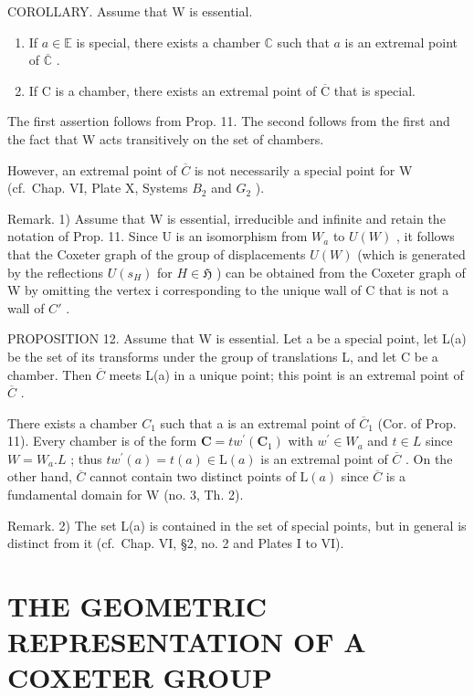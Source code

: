 COROLLARY. Assume that W is essential.

\begin{enumerate}
\def\labelenumi{(\roman{enumi})}
\item
  If \(a \in \mathbb{E}\) is special, there exists a chamber \(\mathbb{C}\) such that \(a\) is an extremal point of \(\overline{\mathbb{C}}\) .
\item
  If \(\mathrm{C}\) is a chamber, there exists an extremal point of \(\overline{\mathrm{C}}\) that is special.
\end{enumerate}

The first assertion follows from Prop. 11. The second follows from the first and the fact that W acts transitively on the set of chambers.

However, an extremal point of \(\overline{C}\) is not necessarily a special point for W (cf.~Chap. VI, Plate X, Systems \(B_{2}\) and \(G_{2}\) ).

Remark. 1) Assume that W is essential, irreducible and infinite and retain the notation of Prop. 11. Since U is an isomorphism from \(W_{a}\) to \(U(W)\) , it follows that the Coxeter graph of the group of displacements \(U(W)\) (which is generated by the reflections \(U(s_{H})\) for \(H \in \mathfrak{H}\) ) can be obtained from the Coxeter graph of W by omitting the vertex i corresponding to the unique wall of C that is not a wall of \(C'\) .

PROPOSITION 12. Assume that W is essential. Let a be a special point, let L(a) be the set of its transforms under the group of translations L, and let C be a chamber. Then \(\overline{C}\) meets L(a) in a unique point; this point is an extremal point of \(\overline{C}\) .

There exists a chamber \(C_{1}\) such that a is an extremal point of \(\overline{C}_{1}\) (Cor. of Prop. 11). Every chamber is of the form \(\mathbf{C}=tw^{\prime}(\mathbf{C}_{1})\) with \(w^{\prime}\in W_{a}\) and \(t\in L\) since \(W=W_{a}.L\) ; thus \(tw^{\prime}(a)=t(a)\in\mathrm{L}(a)\) is an extremal point of \(\overline{C}\) . On the other hand, \(\overline{C}\) cannot contain two distinct points of \(\mathrm{L}(a)\) since \(\overline{C}\) is a fundamental domain for W (no. 3, Th. 2).

Remark. 2) The set L(a) is contained in the set of special points, but in general is distinct from it (cf.~Chap. VI, §2, no. 2 and Plates I to VI).

\section{THE GEOMETRIC REPRESENTATION OF A COXETER GROUP}

